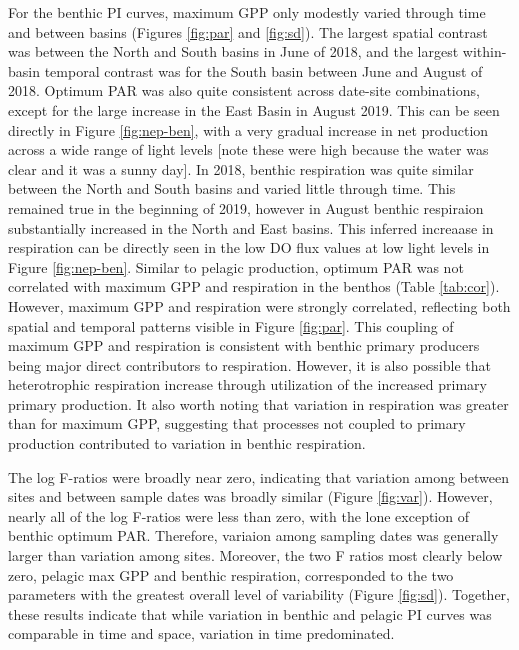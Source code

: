 \documentclass[12pt]{article}
\begin{document}
For the benthic PI curves,
maximum GPP only modestly varied through time and between basins 
(Figures \ref{fig:par} and \ref{fig:sd}).
The largest spatial contrast was between the North and South basins 
in June of 2018, 
and the largest within-basin temporal contrast was for the South basin
between June and August of 2018.
Optimum PAR was also quite consistent across date-site combinations,
except for the large increase in the East Basin in August 2019.
This can be seen directly in Figure \ref{fig:nep-ben},
with a very gradual increase in net production across a wide range of light levels
[note these were high because the water was clear and it was a sunny day].
In 2018, benthic respiration was quite similar between the North and South basins 
and varied little through time. 
This remained true in the beginning of 2019, 
however in August benthic respiraion substantially increased in the North and East basins.
This inferred increaase in respiration can be directly seen in the low DO flux values
at low light levels in Figure \ref{fig:nep-ben}.
Similar to pelagic production, optimum PAR was not correlated with maximum GPP and respiration in the benthos (Table \ref{tab:cor}).
However, maximum GPP and respiration were strongly correlated,
reflecting both spatial and temporal patterns visible in Figure \ref{fig:par}.
This coupling of maximum GPP and respiration is consistent with benthic primary producers
being major direct contributors to respiration. 
However, it is also possible that heterotrophic respiration increase 
through utilization of the increased primary primary production.
It also worth noting that variation in respiration was greater than for maximum GPP,
suggesting that processes not coupled to primary production contributed 
to variation in benthic respiration.

The log F-ratios were broadly near zero, 
indicating that variation among between sites and between sample dates was broadly similar
(Figure \ref{fig:var}).
However, nearly all of the log F-ratios were less than zero, 
with the lone exception of benthic optimum PAR.
Therefore, variaion among sampling dates was generally larger than variation among sites.
Moreover, the two F ratios most clearly below zero, pelagic max GPP and benthic respiration,
corresponded to the two parameters with the greatest overall level of variability 
(Figure \ref{fig:sd}).
Together, these results indicate that while variation in benthic and pelagic PI curves
was comparable in time and space, variation in time predominated. 
\end{document}

